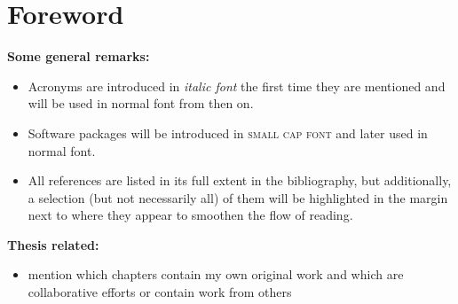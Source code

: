 \chapter*{Foreword}

\textbf{Some general remarks:}
\begin{itemize}
    \item Acronyms are introduced in \textit{italic font} the first time they are mentioned and will be used in normal font from then on.
    \item Software packages will be introduced in \textsc{small cap font} and later used in normal font. 
    \item All references are listed in its full extent in the bibliography, but additionally, a selection (but not necessarily all) of them will be highlighted in the margin next to where they appear to smoothen the flow of reading.
\end{itemize}


\textbf{Thesis related:}
\begin{itemize}
    \item mention which chapters contain my own original work and which are collaborative efforts or contain work from others
\end{itemize}
